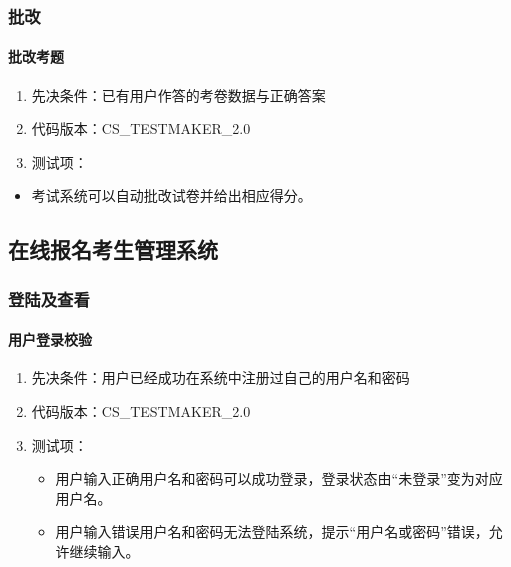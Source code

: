 \documentclass[hyperref, a4paper]{ctexart}
\providecommand{\tightlist}{%
  \setlength{\itemsep}{0pt}\setlength{\parskip}{0pt}}
\let\oldparagraph\paragraph
\renewcommand{\paragraph}[1]{\oldparagraph{#1}\mbox{}}
\begin{document}
\hypertarget{ux6279ux6539}{%
\subsubsection{批改}\label{ux6279ux6539}}

\hypertarget{ux6279ux6539ux8003ux9898}{%
\paragraph{批改考题}\label{ux6279ux6539ux8003ux9898}}

\begin{enumerate}
\def\labelenumi{\arabic{enumi}.}
\tightlist
\item
  先决条件：已有用户作答的考卷数据与正确答案
\item
  代码版本：CS\_TESTMAKER\_2.0
\item
  测试项：
\end{enumerate}

\begin{itemize}
\tightlist
\item
  考试系统可以自动批改试卷并给出相应得分。
\end{itemize}

\hypertarget{ux5728ux7ebfux62a5ux540dux8003ux751fux7ba1ux7406ux7cfbux7edf}{%
\subsection{在线报名考生管理系统}\label{ux5728ux7ebfux62a5ux540dux8003ux751fux7ba1ux7406ux7cfbux7edf}}

\hypertarget{ux767bux9646ux53caux67e5ux770b}{%
\subsubsection{登陆及查看}\label{ux767bux9646ux53caux67e5ux770b}}

\hypertarget{ux7528ux6237ux767bux5f55ux6821ux9a8c-1}{%
\paragraph{用户登录校验}\label{ux7528ux6237ux767bux5f55ux6821ux9a8c-1}}

\begin{enumerate}
\def\labelenumi{\arabic{enumi}.}
\tightlist
\item
  先决条件：用户已经成功在系统中注册过自己的用户名和密码
\item
  代码版本：CS\_TESTMAKER\_2.0
\item
  测试项：

  \begin{itemize}
  \tightlist
  \item
    用户输入正确用户名和密码可以成功登录，登录状态由``未登录''变为对应用户名。
  \item
    用户输入错误用户名和密码无法登陆系统，提示``用户名或密码''错误，允许继续输入。
  \end{itemize}
\end{enumerate}
\end{document}
